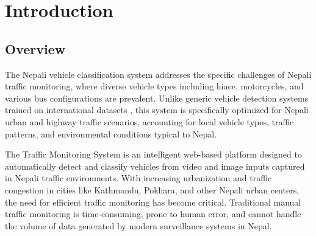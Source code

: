 \documentclass[12pt,a4paper]{report}
\begin{document}
\newpage

\tableofcontents
\newpage

\listoffigures
\newpage

\listoftables
\newpage

\setcounter{page}{1}

\chapter{Introduction}

\section{Overview}
The Nepali vehicle classification system addresses the specific challenges of Nepali traffic monitoring, where diverse vehicle types including hiace, motorcycles, and various bus configurations are prevalent. Unlike generic vehicle detection systems trained on international datasets \cite{sivaraman2016detecting}, this system is specifically optimized for Nepali urban and highway traffic scenarios, accounting for local vehicle types, traffic patterns, and environmental conditions typical to Nepal.

The Traffic Monitoring System is an intelligent web-based platform designed to automatically detect and classify vehicles from video and image inputs captured in Nepali traffic environments. With increasing urbanization and traffic congestion in cities like Kathmandu, Pokhara, and other Nepali urban centers, the need for efficient traffic monitoring has become critical. Traditional manual traffic monitoring is time-consuming, prone to human error, and cannot handle the volume of data generated by modern surveillance systems in Nepal.
\end{document}
